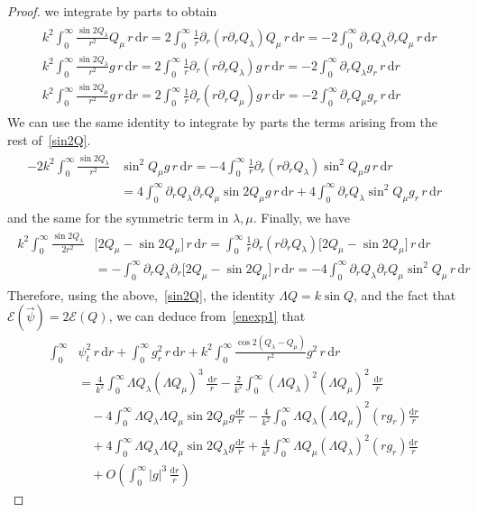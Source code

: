 \documentclass[10pt,reqno]{amsart}
\newcommand{\E}{\mathcal{E}}
\newcommand{\la}{\lambda}
\newcommand{\La}{\Lambda}
\newcommand{\p}{\partial}
\newcommand{\I}{\infty}
\newcommand{\abs}[1]{\left\lvert{#1}\right\rvert}
\newcommand{\ant}[1]{\begin{align*}\begin{split} #1 \end{split}\end{align*}}
\newcommand{\EQ}[1]{\begin{equation}\begin{split} #1 \end{split}\end{equation}}
\numberwithin{equation}{section}
\theoremstyle{remark}
\newcounter{parts}
\newcommand{\rdr}{ \, r \, \mathrm{d}r}
\newcommand{\dr}{\, \mathrm{d}r}
\newcommand{\ud}{\mathrm{d}}
\newcommand{\0}{\emptyset}
\begin{document}
\begin{proof}
 we  integrate by parts to obtain
 \ant{
 &k^2 \int_0^{\infty}  \frac{  \sin 2Q_{\la}}{r^2}Q_\mu \rdr  =  2\int_0^\I \frac{1}{r} \p_r( r \p_r Q_\la) Q_\mu \rdr = - 2\int_0^{\infty}  \p_r Q_\la \p_r Q_\mu \rdr\\
 & k^2 \int_0^{\infty}  \frac{  \sin 2Q_{\la}}{r^2}g \rdr  =  2\int_0^\I \frac{1}{r} \p_r( r \p_r Q_\la) g \rdr = - 2\int_0^{\infty}  \p_r Q_\la g_r  \rdr\\
 & k^2 \int_0^{\infty}  \frac{  \sin 2Q_{\mu}}{r^2}g \rdr  =  2\int_0^\I \frac{1}{r} \p_r( r \p_r Q_\mu) g \rdr = - 2\int_0^{\infty}  \p_r Q_\mu g_r  \rdr
}
We can use the same identity to integrate by parts the terms arising from the rest of~\eqref{sin2Q}. 
\ant{
-2 k^2 \int_0^\I \frac{ \sin 2Q_\la}{r^2} & \sin^2Q_\mu g \rdr = -4 \int_0^\I \frac{1}{r} \p_r( r \p_r Q_\la) \sin^2 Q_\mu g  \rdr \\
& = 4 \int_0^\I \p_r Q_\la  \p_r Q_\mu \sin 2Q_\mu g \rdr + 4 \int_0^\I \p_r Q_\la  \sin^2 Q_\mu g_r \rdr
}
and the same for the symmetric term in $\la, \mu$. Finally, we have 
\ant{
k^2 \int_0^\I \frac{ \sin2 Q_\la}{ 2r^2}& \big[2Q_\mu - \sin 2Q_\mu] \rdr =  \int_0^\I\frac{1}{r}\p_r( r \p_r Q_\la)  \big[2Q_\mu - \sin 2Q_\mu] \rdr \\
& =  - \int_0^\I \p_r Q_\la \p_r  \big[2Q_\mu - \sin 2Q_\mu] \rdr  = - 4\int_0^\I \p_r Q_\la \p_r Q_\mu \sin^2 Q_\mu \rdr
}
Therefore, using the above,~\eqref{sin2Q}, the identity $\La Q = k \sin  Q$, and the fact that $\E( \vec \psi) = 2 \E(Q)$, we can deduce from~\eqref{enexp1} that 
\EQ{ \label{eq:enexp2}
 \int_0^\I &\psi_t^2 \rdr +  \int_0^\infty g_r^2 \rdr + k^2 \int_0^{\infty}  \frac{ \cos 2(Q_\la - Q_\mu)}{r^2} g^2  \rdr \\
 & =   \frac{4}{k^2} \int_0^\I \La Q_\la (\La Q_\mu)^3 \, \frac{\dr}{r} - \frac{2}{k^2}\int_0^\I (\La Q_\la)^2 (\La Q_\mu)^2 \, \frac{\dr}{r}  \\
 &  \quad  - 4 \int_0^\I \La Q_\la  \La Q_\mu \sin 2Q_\mu g \frac{\ud r}{r} -  \frac{4}{k^2} \int_0^\I \La Q_\la  (\La Q_\mu)^2 (rg_r) \frac{\ud r}{r} \\
 & \quad + 4 \int_0^\I \La Q_\la  \La Q_\mu \sin 2Q_\la  g \frac{\ud r}{r} + \frac{4}{k^2} \int_0^\I \La Q_\mu  (\La Q_\la)^2 (r g_r) \frac{\ud r}{r} \\
 &\quad  %
 + O\left( \int_0^\infty \abs{g}^3 \, \frac{ \ud r}{r}\right) 
}
\end{proof}
\end{document}
